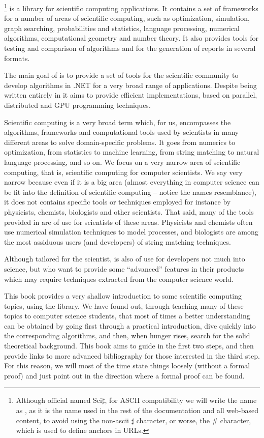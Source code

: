 \sct\footnote{Although official named Sci$\sharp$, for ASCII compatibility
we will write the name as \sct, as it is the name used in the
rest of the documentation and all web-based content, to avoid using
the non-ascii $\sharp$ character, or worse, the \# character, which
is used to define anchors in URLs.} is a \cs library for scientific computing applications.
It contains a set of frameworks for a number of areas of scientific
computing, such as optimization, simulation, graph searching, 
probabilities and statistics, language processing, numerical algorithms,
computational geometry and number theory. It also provides tools for
testing and comparison of algorithms and for the generation of 
reports in several formats.

The main goal of \sct is to provide a set of tools for
the scientific community to develop algorithms in .NET for 
a very broad range of applications. Despite
being written entirely in \cs it aims to provide efficient
implementations, based on parallel, distributed and GPU programming
techniques.

Scientific computing is a very broad term which, for us, encompasses
the algorithms, frameworks and computational tools used by scientists in 
many different areas to solve domain-specific problems. It goes
from numerics to optimization, from statistics to machine learning,
from string matching to natural language processing, and so on.
We focus on a very narrow area of scientific computing, that is,
scientific computing for computer scientists. We say very narrow because
even if it is a big area (almost everything in computer science can
be fit into the definition of scientific computing -- notice the
names resemblance), it does not contains specific tools or
techniques employed for instance by physicists, chemists, biologists 
and other scientists. That said, many of the tools provided
in \sct are of use for scientists of these areas. Physicists and
chemists often use numerical simulation techniques to model
processes, and biologists are among the most assiduous users
(and developers) of string matching techniques.

Although tailored for the scientist, \sct is also of use
for developers not much into science, but who want to provide some
``advanced'' features in their products which may require
techniques extracted from the computer science world.

This book provides a very shallow introduction to some
scientific computing topics, using the \sct library. 
We have found out, through 
teaching many of these topics to computer science students,
that most of times a better understanding can be obtained by going
first through a practical introduction, dive quickly into the
corresponding algorithms, and then, when hunger rises, search
for the solid theoretical background. This book aims to guide in
the first two steps, and then provide links to more advanced 
bibliography for those interested in the third step. 
For this reason, we will most
of the time state things loosely (without a formal proof) and
just point out in the direction where a formal proof can be found.

